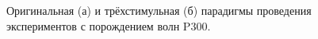 \documentclass[12pt,fleqn]{article}
\begin{document}
\begin{figure}[h!]
\begin{minipage}[h!]{0.47\linewidth}
\end{minipage}
\hfill
\begin{minipage}[h!]{0.52\linewidth}
\end{minipage}
\caption{Оригинальная (а) и трёхстимульная (б) парадигмы проведения экспериментов с порождением волн P300.}
\label{paradigms}
\end{figure}
\end{document}
